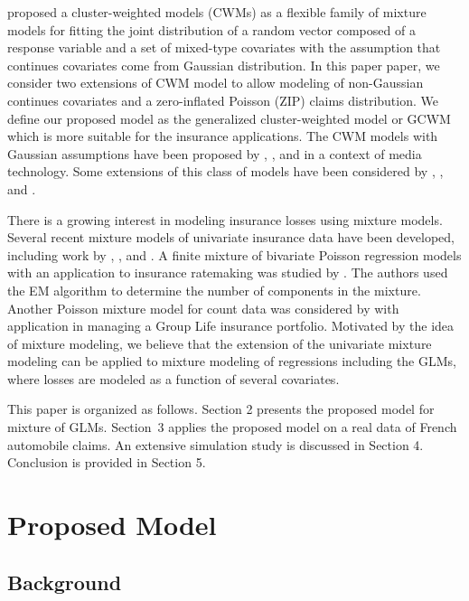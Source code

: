 \documentclass[11pt,letterpaper]{article}
\numberwithin{equation}{section}
\numberwithin{equation}{section}
\numberwithin{equation}{section}
\begin{document}
\cite{Ingrassia+Punzo+Vittadini+Minotti:2015} proposed a cluster-weighted models (CWMs) as a flexible family of mixture models for fitting the joint distribution of a random vector composed of a response variable and a set of mixed-type covariates with the assumption that continues covariates come from Gaussian distribution. In this paper paper, we consider two extensions of CWM model to allow modeling of non-Gaussian continues covariates and a zero-inflated Poisson (ZIP) claims distribution. We define our proposed model as the generalized cluster-weighted model or GCWM which is more suitable for the insurance applications.
%
The CWM models with Gaussian assumptions have been proposed by \cite{Gershenfeld:1997}, \cite{Gershenfeld:Schoner+Metois:1999}, and \cite{Gershenfeld:1999} in a context of media technology. Some extensions of this class of models have been considered by \cite{Punzo+Ingrassia:2015}, \cite{Ingrassia+Minotti+Punzo:2014}, and \cite{Ingrassia+Minotti+Vittadini:2012}.

There is a growing interest in modeling insurance losses using mixture models. Several recent mixture models of univariate insurance data have been developed, including work by \cite{Lee+Lin:2010}, \cite{Verbelen+Gong+Antonio+Badescu+Lin:2015}, and \cite{Miljkovic+Grun:2016}. A finite mixture of bivariate Poisson regression models with an application to insurance ratemaking was studied by \cite{Bermudez+Karlis:2012}. The authors used the EM algorithm to determine the number of components in the mixture. Another Poisson mixture model for count data was considered by \cite{Brown+Buckley:2015} with application in managing a Group Life insurance portfolio. Motivated by the idea of mixture modeling, we believe that the extension of the univariate mixture modeling can be applied to mixture modeling of regressions including the GLMs, where losses are modeled as a function of several covariates.

This paper is organized as follows. Section 2 presents the proposed model for mixture of GLMs. Section~3 applies the proposed model on a real data of French automobile claims. An extensive simulation study is discussed in Section 4. Conclusion is provided in Section 5.


\section{Proposed Model}

\subsection{Background}
\end{document}
